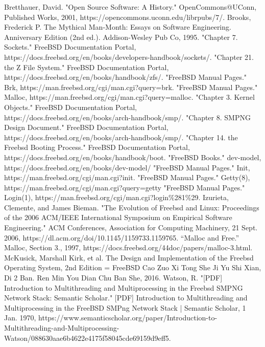 \documentclass[12pt, dvipsnames, a4paper]{article}
\begin{document}
\begin{thebibliography}{00}
	Bretthauer, David. "Open Source Software: A History." OpenCommons@UConn, Published Works, 2001, https://opencommons.uconn.edu/librpubs/7/.
	 Brooks, Frederick P. The Mythical Man-Month: Essays on Software Engineering. Anniversary Edition (2nd ed.). Addison-Wesley Pub Co, 1995.
	 "Chapter 7. Sockets." FreeBSD Documentation Portal, https://docs.freebsd.org/en/books/developers-handbook/sockets/.
	 "Chapter 21. the Z File System." FreeBSD Documentation Portal, https://docs.freebsd.org/en/books/handbook/zfs/.
	 "FreeBSD Manual Pages." Brk, https://man.freebsd.org/cgi/man.cgi?query=brk.
	 "FreeBSD Manual Pages." Malloc, https://man.freebsd.org/cgi/man.cgi?query=malloc.
	 "Chapter 3. Kernel Objects." FreeBSD Documentation Portal, https://docs.freebsd.org/en/books/arch-handbook/smp/.
	 "Chapter 8. SMPNG Design Document." FreeBSD Documentation Portal, https://docs.freebsd.org/en/books/arch-handbook/smp/.
	 "Chapter 14. the Freebsd Booting Process." FreeBSD Documentation Portal, https://docs.freebsd.org/en/books/handbook/boot.
	 "FreeBSD Books." dev-model, https://docs.freebsd.org/en/books/dev-model/
	 "FreeBSD Manual Pages." Init, https://man.freebsd.org/cgi/man.cgi?init.
	 "FreeBSD Manual Pages." Getty(8), https://man.freebsd.org/cgi/man.cgi?query=getty
	 "FreeBSD Manual Pages." Login(1), https://man.freebsd.org/cgi/man.cgi?login\%281\%29.
	Izurieta, Clemente, and James Bieman. "The Evolution of Freebsd and Linux: Proceedings of the 2006 ACM/IEEE International Symposium on Empirical Software Engineering." ACM Conferences, Association for Computing Machinery, 21 Sept. 2006, https://dl.acm.org/doi/10.1145/1159733.1159765.
	 “Malloc and Free.” Malloc, Section 3., 1997, https://docs.freebsd.org/44doc/papers/malloc-3.html.
	 McKusick, Marshall Kirk, et al. The Design and Implementation of the Freebsd Operating System, 2nd Edition = FreeBSD Cao Zuo Xi Tong She Ji Yu Shi Xian, Di 2 Ban. Ren Min You Dian Chu Ban She, 2016.
	 Watson, R. "[PDF] Introduction to Multithreading and Multiprocessing in the Freebsd SMPNG Network Stack: Semantic Scholar." [PDF]  Introduction to Multithreading and Multiprocessing in the FreeBSD SMPng Network Stack | Semantic Scholar, 1 Jan. 1970, https://www.semanticscholar.org/paper/Introduction-to-Multithreading-and-Multiprocessing-Watson/088630aae6b4622e4175f58045cde69159d9eff5.
\end{thebibliography}
\end{document}
